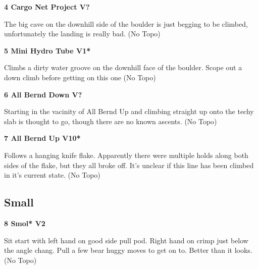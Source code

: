 \begin{multicols}{2}
\needspace{1.5cm}
\label{rt:Cargo Net Project}
\colorbox{black!20}{
\parbox{0.95\linewidth}{
\textbf{
4 Cargo Net Project V?  
}}}

\begin{adjustwidth}{0.5cm}{}			
The big cave on the downhill side of the boulder is just begging to be climbed, unfortunately the landing is really bad. (No Topo)
\end{adjustwidth}



\needspace{1.5cm}
\label{rt:Mini Hydro Tube}
\colorbox{green!20}{
\parbox{0.95\linewidth}{
\textbf{
5 Mini Hydro Tube V1*  \warn
}}}

\begin{adjustwidth}{0.5cm}{}			
Climbs a dirty water groove on the downhill face of the boulder. Scope out a down climb before getting on this one (No Topo)
\end{adjustwidth}



\needspace{1.5cm}
\label{rt:All Bernd Down}
\colorbox{black!20}{
\parbox{0.95\linewidth}{
\textbf{
6 All Bernd Down V?  
}}}

\begin{adjustwidth}{0.5cm}{}			
Starting in the vacinity of All Bernd Up and climbing straight up onto the techy slab is thought to go, though there are no known ascents. (No Topo)
\end{adjustwidth}



\needspace{1.5cm}
\label{rt:All Bernd Up}
\colorbox{red!20}{
\parbox{0.95\linewidth}{
\textbf{
7 All Bernd Up V10*  
}}}

\begin{adjustwidth}{0.5cm}{}			
Follows a hanging knife flake. Apparently there were multiple holds along both sides of the flake, but they all broke off. It's unclear if this line has been climbed in it's current state. (No Topo)
\end{adjustwidth}




\needspace{1.5cm}
\subsection*{Small}\label{bf:Small}
	


\needspace{1.5cm}
\label{rt:Smol}
\colorbox{green!20}{
\parbox{0.95\linewidth}{
\textbf{
8 Smol* V2  
}}}

\begin{adjustwidth}{0.5cm}{}			
Sit start with left hand on good side pull pod. Right hand on crimp just below the angle chang. Pull a few bear huggy moves to get on to. Better than it looks. (No Topo)
\end{adjustwidth}




\newpage
	\end{multicols}
